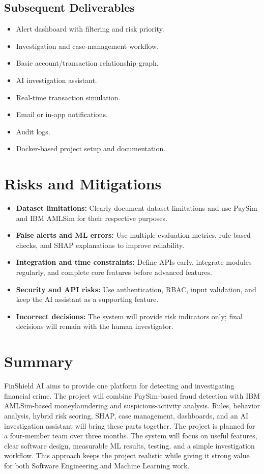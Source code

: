 \documentclass[11pt,a4paper]{article}
\begin{document}
\subsection{Subsequent Deliverables}
\begin{itemize}[leftmargin=0.7cm]
    \item Alert dashboard with filtering and risk priority.
    \item Investigation and case-management workflow.
    \item Basic account/transaction relationship graph.
    \item AI investigation assistant.
    \item Real-time transaction simulation.
    \item Email or in-app notifications.
    \item Audit logs.
    \item Docker-based project setup and documentation.
\end{itemize}

\section{Risks and Mitigations}
\begin{itemize}[leftmargin=0.7cm]
    \item \textbf {Dataset limitations:} Clearly document dataset limitations and use PaySim and IBM AMLSim for their respective purposes.
    \item \textbf {False alerts and ML errors:} Use multiple evaluation metrics, rule-based checks, and SHAP explanations to improve reliability.
    \item \textbf {Integration and time constraints:} Define APIs early, integrate modules regularly, and complete core features before advanced features.
    \item \textbf {Security and API risks: } Use authentication, RBAC, input validation, and keep the AI assistant as a supporting feature.
    \item \textbf {Incorrect decisions: } The system will provide risk indicators only; final decisions will remain with the human investigator.
\end{itemize}

\section{Summary}
FinShield AI aims to provide one platform for detecting and investigating financial crime. The project will combine PaySim-based fraud detection with IBM AMLSim-based moneylaundering and suspicious-activity analysis. Rules, behavior analysis, hybrid risk scoring, SHAP, case management, dashboards, and an AI investigation assistant will bring these parts together.
The project is planned for a four-member team over three months. The system will focus on useful features, clear software design, measurable ML results, testing, and a simple investigation workflow. This approach keeps the project realistic while giving it strong value for both Software Engineering and Machine Learning work.
\end{document}
